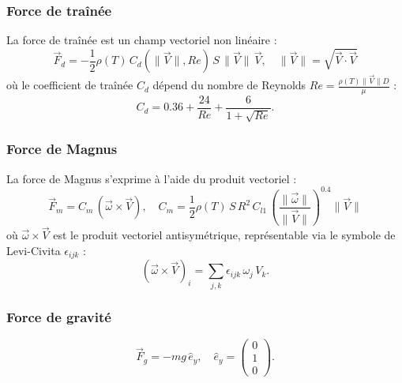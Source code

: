 \documentclass[10pt,a4paper]{report}
\begin{document}
\subsubsection{Force de traînée}
La force de traînée est un champ vectoriel non linéaire :
\begin{equation}
    \vec{F}_d = -\frac{1}{2} \rho(T) \, C_d(\|\vec{V}\|, Re) \, S \, \|\vec{V}\| \, \vec{V}, \quad \|\vec{V}\| = \sqrt{\vec{V} \cdot \vec{V}}
    \label{eq:tensor_drag}
\end{equation}
où le coefficient de traînée $C_d$ dépend du nombre de Reynolds $Re = \frac{\rho(T) \|\vec{V}\| D}{\mu}$ :
\begin{equation}
    C_d = 0.36 + \frac{24}{Re} + \frac{6}{1 + \sqrt{Re}}.
    \label{eq:tensor_cd}
\end{equation}

\subsubsection{Force de Magnus}
La force de Magnus s'exprime à l'aide du produit vectoriel :
\begin{equation}
    \vec{F}_m = C_m \, (\vec{\omega} \times \vec{V}), \quad C_m = \frac{1}{2} \rho(T) \, S \, R^2 \, C_{l1} \, \left( \frac{\|\vec{\omega}\|}{\|\vec{V}\|} \right)^{0.4} \|\vec{V}\|
    \label{eq:tensor_magnus}
\end{equation}
où $\vec{\omega} \times \vec{V}$ est le produit vectoriel antisymétrique, représentable via le symbole de Levi-Civita $\epsilon_{ijk}$ :
\begin{equation}
    (\vec{\omega} \times \vec{V})_i = \sum_{j,k} \epsilon_{ijk} \, \omega_j \, V_k.
    \label{eq:tensor_cross}
\end{equation}

\subsubsection{Force de gravité}
\begin{equation}
    \vec{F}_g = -m g \, \hat{e}_y, \quad \hat{e}_y = \begin{pmatrix} 0 \\ 1 \\ 0 \end{pmatrix}.
    \label{eq:tensor_gravity}
\end{equation}
\end{document}
